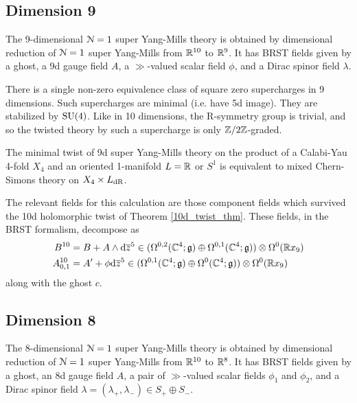 \documentclass[10pt, oneside]{article}
\begin{document}
\subsection{Dimension 9}
The 9-dimensional $\mathcal{N}=1$ super Yang-Mills theory is obtained by dimensional reduction of $\mathcal{N}=1$ super Yang-Mills from $\mathbb R^{10}$ to $\mathbb R^9$.  It has BRST fields given by a ghost, a 9d gauge field $A$, a $\gg$-valued scalar field $\phi$, and a Dirac spinor field $\lambda$.

There is a single non-zero equivalence class of square zero supercharges in 9 dimensions. Such supercharges are minimal (i.e. have 5d image).  They are stabilized by $\mathrm{SU}(4)$.  Like in 10 dimensions, the R-symmetry group is trivial, and so the twisted theory by such a supercharge is only $\mathbb Z/2\mathbb Z$-graded.

\begin{theorem}
The minimal twist of 9d super Yang-Mills theory on the product of a Calabi-Yau 4-fold $X_4$ and an oriented 1-manifold $L = \mathbb R$ or $S^1$ is equivalent to mixed Chern-Simons theory on $X_4 \times L_{\mathrm{dR}}$.
\end{theorem}

The relevant fields for this calculation are those component fields which survived the 10d holomorphic twist of Theorem \ref{10d_twist_thm}.  These fields, in the BRST formalism, decompose as
\begin{align*}
B^{10} &= B + A \wedge {\rm d} \overline{z}^5 \in (\Omega^{0,2}(\mathbb C^4; \mathfrak{g}) \oplus \Omega^{0,1}(\mathbb C^4; \mathfrak{g})) \otimes \Omega^0(\mathbb R x_9) \\
A^{10}_{0,1} &= A' + \phi {\rm d} \overline{z}^5 \in (\Omega^{0,1}(\mathbb C^4; \mathfrak{g}) \oplus \Omega^0(\mathbb C^4; \mathfrak{g})) \otimes \Omega^0(\mathbb R x_9)
\end{align*}
along with the ghost $c$. 

\subsection{Dimension 8}
The 8-dimensional $\mathcal{N}=1$ super Yang-Mills theory is obtained by dimensional reduction of $\mathcal{N}=1$ super Yang-Mills from $\mathbb R^{10}$ to $\mathbb R^8$.  It has BRST fields given by a ghost, an 8d gauge field $A$, a pair of $\gg$-valued scalar fields $\phi_1$ and $\phi_2$, and a Dirac spinor field $\lambda = (\lambda_+, \lambda_-) \in S_+ \oplus S_-$.
\end{document}
